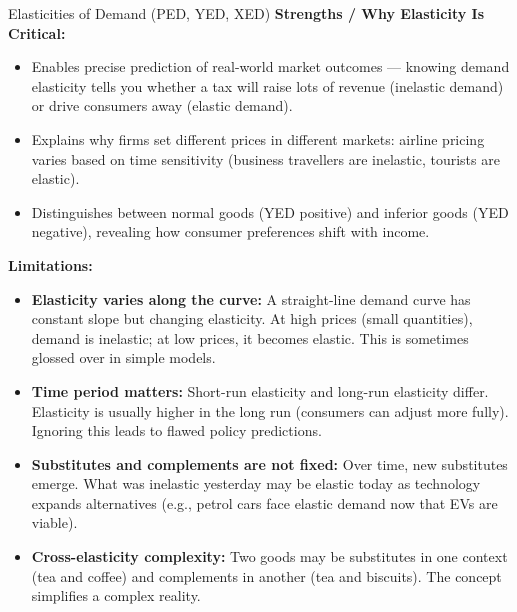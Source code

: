 \documentclass[11pt, a4paper, twoside]{book}
\begin{document}
\begin{evaluation}{Elasticities of Demand (PED, YED, XED)}
\textbf{Strengths / Why Elasticity Is Critical:}
\begin{itemize}[leftmargin=*, nosep]
\item Enables precise prediction of real-world market outcomes — knowing demand elasticity tells you whether a tax will raise lots of revenue (inelastic demand) or drive consumers away (elastic demand).
\item Explains why firms set different prices in different markets: airline pricing varies based on time sensitivity (business travellers are inelastic, tourists are elastic).
\item Distinguishes between normal goods (YED positive) and inferior goods (YED negative), revealing how consumer preferences shift with income.
\end{itemize}

\textbf{Limitations:}
\begin{itemize}[leftmargin=*, nosep]
\item \textbf{Elasticity varies along the curve:} A straight-line demand curve has constant slope but changing elasticity. At high prices (small quantities), demand is inelastic; at low prices, it becomes elastic. This is sometimes glossed over in simple models.
\item \textbf{Time period matters:} Short-run elasticity and long-run elasticity differ. Elasticity is usually higher in the long run (consumers can adjust more fully). Ignoring this leads to flawed policy predictions.
\item \textbf{Substitutes and complements are not fixed:} Over time, new substitutes emerge. What was inelastic yesterday may be elastic today as technology expands alternatives (e.g., petrol cars face elastic demand now that EVs are viable).
\item \textbf{Cross-elasticity complexity:} Two goods may be substitutes in one context (tea and coffee) and complements in another (tea and biscuits). The concept simplifies a complex reality.
\end{itemize}


\end{evaluation}
\end{document}

